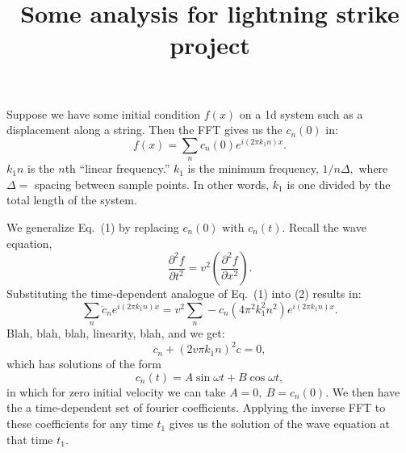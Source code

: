 \documentclass{article}
\title{Some analysis for lightning strike project}
\begin{document}
\maketitle
Suppose we have some initial condition $f(x)$ on a 1d system such as a displacement along a string. Then the FFT gives us the $c_n(0)$ in:
\begin{equation}
f(x)=\sum_n c_n(0)e^{i(2\pi k_1 n) x}.
\end{equation}$k_1n$ is the $n$th ``linear frequency.'' $k_1$ is the minimum frequency, $1/n\Delta,$ where $\Delta=$ spacing between sample points. In other words, $k_1$ is one divided by the total length of the system.

We generalize Eq.~(1) by replacing $c_n(0)$ with $c_n(t).$ Recall the wave equation,\begin{equation}\frac{\partial^2f}{\partial t^2}=v^2\left(\frac{\partial^2f}{\partial x^2}\right).\end{equation}Substituting the time-dependent analogue of Eq.~(1) into (2) results in:
\begin{equation}\sum_n\ddot{c}_n e^{i(2\pi k_1 n)x}=v^2\sum_n -c_n (4\pi^2k_1^2n^2)e^{i(2\pi k_1 n)x}.\end{equation}
Blah, blah, blah, linearity, blah, and we get:\begin{equation}\ddot{c}_n+(2v\pi k_1n)^2c=0,\end{equation} which has solutions of the form \begin{equation}c_n(t)=A\sin\omega t+B\cos\omega t,\end{equation} in which for zero initial velocity we can take $A=0,\ B=c_n(0).$ We then have the a time-dependent set of fourier coefficients. Applying the inverse FFT to these coefficients for any time $t_1$ gives us the solution of the wave equation at that time $t_1.$
\end{document}
